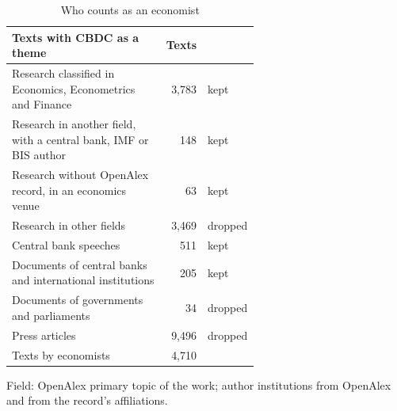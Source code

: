 \begin{table}[htbp]
\centering\small
\caption{Who counts as an economist}\label{tab:economists}
\begin{tabular}{@{}p{0.62\linewidth}rl@{}}
\toprule
\textbf{Texts with CBDC as a theme} & \textbf{Texts} &  \\
\midrule
Research classified in Economics, Econometrics and Finance & 3,783 & kept \\
Research in another field, with a central bank, IMF or BIS author & 148 & kept \\
Research without OpenAlex record, in an economics venue & 63 & kept \\
Research in other fields & 3,469 & dropped \\
Central bank speeches & 511 & kept \\
Documents of central banks and international institutions & 205 & kept \\
Documents of governments and parliaments & 34 & dropped \\
Press articles & 9,496 & dropped \\
\midrule Texts by economists & 4,710 & \\
\bottomrule
\end{tabular}
\par\smallskip\parbox{0.92\linewidth}{\footnotesize Field: OpenAlex primary topic of the work; author institutions from OpenAlex and from the record's affiliations.}
\end{table}
